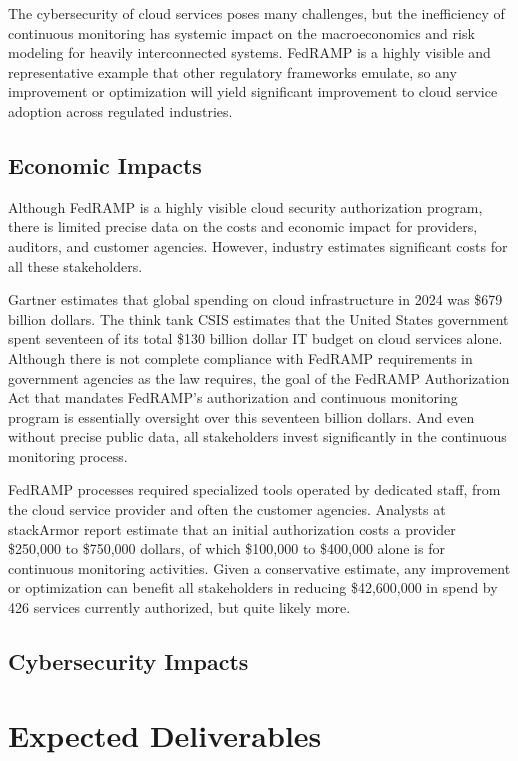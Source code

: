 \documentclass{jdf}
\begin{document}
The cybersecurity of cloud services poses many challenges, but the inefficiency of continuous monitoring has systemic impact on the macroeconomics and risk modeling for heavily interconnected systems. FedRAMP is a highly visible and representative example that other regulatory frameworks emulate, so any improvement or optimization will yield significant improvement to cloud service adoption across regulated industries.

\subsection{Economic Impacts}

Although FedRAMP is a highly visible cloud security authorization program, there is limited precise data on the costs and economic impact for providers, auditors, and customer agencies. However, industry estimates significant costs for all these stakeholders.

Gartner estimates that global spending on cloud infrastructure in 2024 was \$679 billion dollars. The think tank CSIS estimates that the United States government spent seventeen of its total \$130 billion dollar IT budget on cloud services alone. Although there is not complete compliance with FedRAMP requirements in government agencies as the law requires, the goal of the FedRAMP Authorization Act that mandates FedRAMP's authorization and continuous monitoring program is essentially oversight over this seventeen billion dollars. And even without precise public data, all stakeholders invest significantly in the continuous monitoring process.

FedRAMP processes required specialized tools operated by dedicated staff, from the cloud service provider and often the customer agencies. Analysts at stackArmor report estimate that an initial authorization costs a provider \$250,000 to \$750,000 dollars, of which \$100,000 to \$400,000 alone is for continuous monitoring activities. Given a conservative estimate, any improvement or optimization can benefit all stakeholders in reducing \$42,600,000 in spend by 426 services currently authorized, but quite likely more. 

\subsection{Cybersecurity Impacts}


\section{Expected Deliverables}
\end{document}
